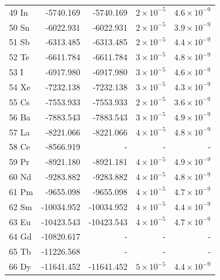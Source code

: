 \begin{longtable}{l r r r r}
49 In       &    -5740.169        &  -5740.169        &   $2\times10^{-5}$      &   $4.6\times10^{-9}$    \\
50 Sn       &    -6022.931        &  -6022.931        &   $2\times10^{-5}$      &   $3.9\times10^{-9}$    \\
51 Sb       &    -6313.485        &  -6313.485        &   $2\times10^{-5}$      &   $4.4\times10^{-9}$    \\
52 Te       &    -6611.784        &  -6611.784        &   $3\times10^{-5}$      &   $4.8\times10^{-9}$    \\
53 I        &    -6917.980        &  -6917.980        &   $3\times10^{-5}$      &   $4.6\times10^{-9}$    \\
54 Xe       &    -7232.138        &  -7232.138        &   $3\times10^{-5}$      &   $4.3\times10^{-9}$    \\
55 Cs       &    -7553.933        &  -7553.933        &   $2\times10^{-5}$      &   $3.6\times10^{-9}$    \\
56 Ba       &    -7883.543        &  -7883.543        &   $3\times10^{-5}$      &   $4.9\times10^{-9}$    \\
57 La       &    -8221.066        &  -8221.066        &   $4\times10^{-5}$      &   $4.8\times10^{-9}$    \\
58 Ce       &    -8566.919        &  -                &    -                    &    -                    \\
59 Pr       &    -8921.180        &  -8921.181        &   $4\times10^{-5}$      &   $4.9\times10^{-9}$   \\
60 Nd       &    -9283.882        &  -9283.882        &   $4\times10^{-5}$      &   $4.8\times10^{-9}$    \\
61 Pm       &    -9655.098        &  -9655.098        &   $4\times10^{-5}$      &   $4.7\times10^{-9}$    \\
62 Sm       &   -10034.952        & -10034.952        &   $4\times10^{-5}$      &   $4.4\times10^{-9}$    \\
63 Eu       &   -10423.543        & -10423.543        &   $4\times10^{-5}$      &   $4.7\times10^{-9}$    \\
64 Gd       &   -10820.617        & -                 &    -                    &    -                    \\
65 Tb       &   -11226.568        & -                 &    -                    &    -                    \\
66 Dy       &   -11641.452        & -11641.452        &   $5\times10^{-5}$      &   $4.4\times10^{-9}$    \\

\end{longtable}
